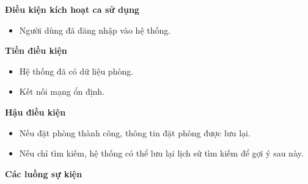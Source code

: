 \textbf{Điều kiện kích hoạt ca sử dụng}
\begin{itemize}
    \item Người dùng đã đăng nhập vào hệ thống.
\end{itemize}

\textbf{Tiền điều kiện}
\begin{itemize}
    \item Hệ thống đã có dữ liệu phòng.
    \item Kết nối mạng ổn định.
\end{itemize}

\textbf{Hậu điều kiện}
\begin{itemize}
    \item Nếu đặt phòng thành công, thông tin đặt phòng được lưu lại.
    \item Nếu chỉ tìm kiếm, hệ thống có thể lưu lại lịch sử tìm kiếm để gợi ý sau này.
\end{itemize}

\textbf{Các luồng sự kiện}

